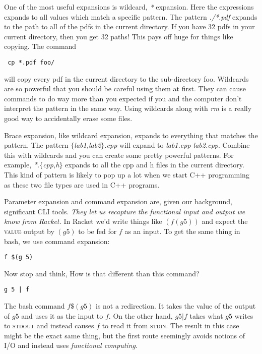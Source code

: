 \documentclass[nobib]{tufte-handout}
\begin{document}
One of the most useful expansions is wildcard, \textit{*} expansion.  Here the expressions expands to all values which match a specific pattern.  The pattern \textit{./*.pdf} expands to the path to all of the pdfs in the current directory.  If you have 32 pdfs in your current directory, then you get 32 paths! This pays off huge for things like copying.  The command \begin{verbatim} cp *.pdf foo/ \end{verbatim} will copy every pdf in the current directory to the sub-directory foo.  Wildcards are so powerful that you should be careful using them at first.  They can cause commands to do way more than you expected if you and the computer don't interpret the pattern in the same way.  Using wildcards along with \textit{rm} is a really good way to accidentally erase some files.

Brace expansion, like wildcard expansion, expands to everything that matches the pattern. The pattern \textit{$\{$lab1,lab2$\}$.cpp} will expand to \textit{lab1.cpp lab2.cpp}.  Combine this with wildcards and you can create some pretty powerful patterns.  For example, \textit{*.$\{$cpp,h$\}$} expands to all the cpp and h files in the current directory.  This kind of pattern is likely to pop up a lot when we start C++ programming as these two file types are used in C++ programs.


Parameter expansion and command expansion are, given our background, significant CLI tools. \textit{They let us recapture the functional input and output we know from Racket.} In Racket we'd write things like $(f (g 5))$ and expect the \textsc{value} output by $(g 5)$ to be fed for $f$ as an input.  To get the same thing in bash, we use command expansion:
\begin{verbatim}
f $(g 5)
\end{verbatim}
Now stop and think, How is that different than this command?
\begin{verbatim}
g 5 | f
\end{verbatim}

The bash command $f \$(g 5)$ is not a redirection. It takes the value of the output of $g 5$ and uses it as the input to $f$. On the other hand, $g 5 | f$ takes what $g 5$ writes to \textsc{stdout} and instead causes $f$ to read it from \textsc{stdin}.  The result in this case might be the exact same thing, but the first route seemingly avoids notions of \textsc{I/O} and instead uses \textit{functional computing}.
\end{document}
